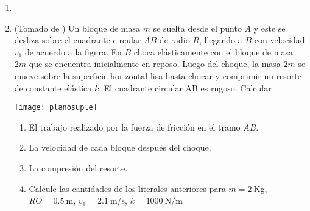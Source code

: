 \begin{enumerate}
\begin{itemize}
\begin{itemize}
  \end{itemize}

\end{itemize}


\item 

\item (Tomado de \cite{gabriel}) Un bloque de masa $m$ se suelta desde el punto $A$ y este se desliza sobre el cuadrante circular $AB$ de radio $R$, llegando a $B$ con velocidad $v_1$ de acuerdo a la figura. En $B$ choca elásticamente con el bloque de masa $2m$ que se encuentra inicialmente en reposo. Luego del choque, la masa $2m$ se mueve sobre la superficie horizontal lisa hasta chocar y comprimir un resorte de constante elástica $k$. El cuadrante circular AB es rugoso. Calcular

  \begin{minipage}{0.5\linewidth}
    \texttt{[image: planosuple]}
  \end{minipage}
  \begin{minipage}{0.5\linewidth}
    \begin{enumerate}
    \item El trabajo realizado por la fuerza de fricción en el tramo $AB$.
      \label{item:p2a}
    \item La velocidad de cada bloque después del choque.
      \label{item:p2b}
    \item La compresión del resorte.
      \label{item:p2c}
    \item Calcule las cantidades de los literales anteriores para $m=2\ $Kg, $RO=0.5\ $m, $v_1=2.1\ $m/s, $k=1000\ $N/m
    \end{enumerate}
  \end{minipage}


\end{enumerate}
